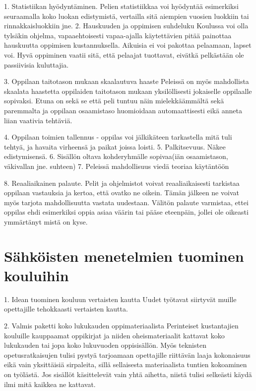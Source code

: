 \documentclass[utf8,bachelor]{gradu3}
\begin{document}
1. Statistiikan hyödyntäminen. %
Pelien statistiikkaa voi hyödyntää esimerkiksi seuraamalla koko luokan edistymistä, vertailla sitä aiempien vuosien luokkiin tai rinnakkaisluokkiin jne.
2. Hauskuuden ja oppimisen suhdeluku
	Koulussa voi olla tylsäkin ohjelma, vapaaehtoisesti vapaa-ajalla käytettävien pitää painottaa hauskuutta oppimisen kustannuksella.
Aikuisia ei voi pakottaa pelaamaan, lapset voi. Hyvä oppiminen vaatii sitä, että pelaajat tuottavat, eivätkä pelkästään ole passiivisia kuluttajia. %

3. Oppilaan taitotason mukaan skaalautuva haaste \parencite[][]{koulunArki} \parencite[][13-14]{gamePaper}
Peleissä on myös mahdollista skaalata haastetta oppilaiden taitotason mukaan yksilöllisesti jokaiselle oppilaalle sopivaksi. Etuna on sekä se että peli tuntuu näin mielekkäämmältä sekä paremmalta ja oppilaan osaamistaso huomioidaan automaattisesti eikä anneta liian vaativia tehtäviä.


4. Oppilaan toimien tallennus - oppilas voi jälkikäteen tarkastella mitä tuli tehtyä, ja havaita virheensä ja paikat joissa loisti.
5. Palkitsevuus. Näkee edistymisensä.
6. Sisällön oltava kohderyhmälle sopivaa(iän osaamistason, väkivallan jne. suhteen) 
7. Peleissä mahdollisuus viedä teoriaa käytäntöön

8. Reaaliaikainen palaute.
Pelit ja ohjelmistot voivat reaaliaikaisesti tarkistaa oppilaan vastauksia ja kertoa, että ovatko ne oikein. Tämän jälkeen ne voivat myös tarjota mahdollisuutta vastata uudestaan. Välitön palaute varmistaa, ettei oppilas ehdi esimerkiksi oppia asiaa väärin tai pääse eteenpäin, jollei ole oikeasti ymmärtänyt mistä on kyse.

\section{Sähköisten menetelmien tuominen kouluihin}
1. Idean tuominen kouluun vertaisten kautta
Uudet työtavat siirtyvät muille opettajille tehokkaasti vertaisten kautta. \parencite[][]{koulunArki}

2. Valmis paketti koko lukukauden oppimateriaalista
Perinteiset kustantajien kouluille kauppaamat oppikirjat ja niiden oheismateriaalit kattavat koko lukukauden tai jopa koko lukuvuoden oppisisällön. Myös teknisten opetusratkaisujen tulisi pystyä tarjoamaan opettajille riittävän laaja kokonaisuus eikä vain yksittäisiä sirpaleita, sillä sellaisesta materiaalista tuntien kokoaminen on työlästä. Jos sisällöt käsittelevät vain yhtä aihetta, niistä tulisi selkeästi käydä ilmi mitä kaikkea ne kattavat.
\end{document}
